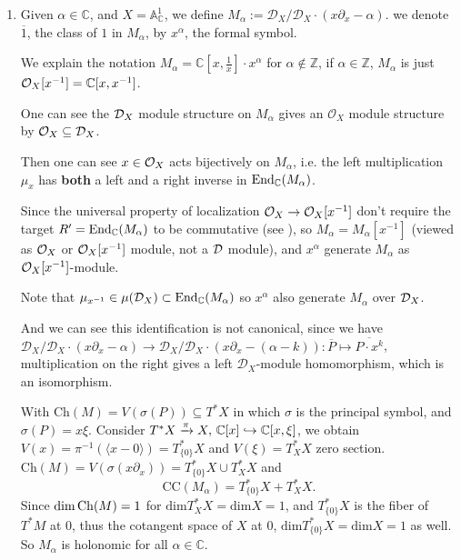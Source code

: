 \begin{example}\label{ex:first-examples-of-d-modules}
    \quad
    \begin{enumerate}
        \item Given $\alpha \in \mathbb{C}$, and $X = \mathbb{A}^1_{\mathbb{C}}$, we define $M_{\alpha} := \mathcal{D}_X / \mathcal{D}_X \cdot (x\partial_x - \alpha)$.
              we denote $\overline{1}$, the class of $1$ in $M_{\alpha}$, by $x^{\alpha}$, the formal symbol.

              We explain the notation $M_{\alpha} = \mathbb{C}[x, \frac{1}{x}] \cdot x^{\alpha}$ for $\alpha \not\in \mathbb{Z}$,
              if $\alpha\in\mathbb{Z}$, $M_\alpha$ is just $\mathcal{O}_X[x^{-1}]=\mathbb{C}[x,x^{-1}]$.

              One can see the $\mathcal{D}_X$ module structure on $M_\alpha$ gives an $\mathcal{O}_X$ module structure by $\mathcal{O}_X \subseteq \mathcal{D}_X$.

              Then one can see $x \in \mathcal{O}_X$ acts bijectively on $M_\alpha$, i.e. the left multiplication $\mu_x$ has \textbf{both} a left and a right inverse in $\operatorname{End}_{\mathbb{C}}(M_\alpha)$.

              Since the universal property of localization $\mathcal{O}_X\to\mathcal{O}_X[x^{-1}]$ don't require the target $R'=\operatorname{End}_{\mathbb{C}}(M_\alpha)$ to be commutative (see \cite[Theorem~(11.3)]{AltmanKleimanTCA2021}),
              so $M_\alpha = M_\alpha[x^{-1}]$ (viewed as $\mathcal{O}_X$ or $\mathcal{O}_X[x^{-1}]$ module, not a $\mathcal{D}$ module), and $x^\alpha$ generate $M_\alpha$ as $\mathcal{O}_X[x^{-1}]$-module.

              Note that $\mu_{x^{-1}}\in \mu(\mathcal{D}_X) \subset \operatorname{End}_{\mathbb{C}}(M_\alpha)$ so $x^\alpha$ also generate $M_\alpha$ over $\mathcal{D}_X$.

              And we can see this identification is not canonical, since we have $\mathcal{D}_X /\mathcal{D}_X \cdot (x\partial_x - \alpha)\to\mathcal{D}_X /\mathcal{D}_X \cdot (x\partial_x - (\alpha - k)): \overline{P} \mapsto \overline{P\cdot x^k}$, multiplication on the right gives a left $\mathcal{D}_X$-module homomorphism, which is an isomorphism.

              With $\mathrm{Ch}(M)=V(\sigma(P))\subseteq T^{\ast}X$ in which $\sigma$ is the principal symbol, and $\sigma(P)=x\xi$. Consider $T^{\ast}X\xrightarrow{\pi} X,\, \mathbb{C}[x]\hookrightarrow\mathbb{C}[x,\xi]$, we obtain $V(x)=\pi ^{-1}(\langle x-0 \rangle)=T^{\ast}_{\{0\}}X$ and $V(\xi)=T^{\ast}_{X}X$ zero section.  $\mathrm{Ch}(M)=V(\sigma(x\partial_{x}))=T^{\ast}_{\{0\}}X\cup T_{X}^{\ast}X$ and  $$\mathrm{CC}(M_{\alpha}) = T_{\{0\}}^*X + T_X^*X.$$Since $\mathrm{dim}\operatorname{Ch}(M)=1$ for $\mathrm{dim}T^{\ast}_{X}X=\mathrm{dim}X=1$, and $T^{\ast}_{\{0\}}X$ is the fiber of $T^{\ast}M$ at $0$, thus the cotangent space of $X$ at $0$, $\mathrm{dim}T^{\ast}_{\{0\}}X=\mathrm{dim}X=1$ as well. So  $M_{\alpha}$ is holonomic for all $\alpha \in \mathbb{C}$.


\end{enumerate}
\end{example}
